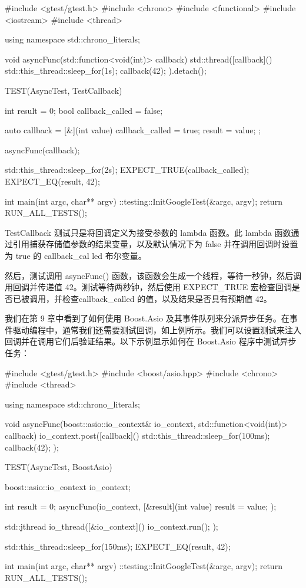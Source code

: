 \begin{cpp}
#include <gtest/gtest.h>
#include <chrono>
#include <functional>
#include <iostream>
#include <thread>

using namespace std::chrono_literals;

void asyncFunc(std::function<void(int)> callback) {
    std::thread([callback]() {
        std::this_thread::sleep_for(1s);
        callback(42);
    }).detach();
}

TEST(AsyncTest, TestCallback) {
    int result = 0;
    bool callback_called = false;

    auto callback = [&](int value) {
        callback_called = true;
        result = value;
    };

    asyncFunc(callback);

    std::this_thread::sleep_for(2s);
    EXPECT_TRUE(callback_called);
    EXPECT_EQ(result, 42);
}

int main(int argc, char** argv) {
    ::testing::InitGoogleTest(&argc, argv);
    return RUN_ALL_TESTS();
}
\end{cpp}

TestCallback 测试只是将回调定义为接受参数的 lambda 函数。此 lambda 函数通过引用捕获存储值参数的结果变量，以及默认情况下为 false 并在调用回调时设置为 true 的 callback\_cal led 布尔变量。

然后，测试调用 asyncFunc() 函数，该函数会生成一个线程，等待一秒钟，然后调用回调并传递值 42。测试等待两秒钟，然后使用 EXPECT\_TRUE 宏检查回调是否已被调用，并检查callback\_called 的值，以及结果是否具有预期值 42。


我们在第 9 章中看到了如何使用 Boost.Asio 及其事件队列来分派异步任务。在事件驱动编程中，通常我们还需要测试回调，如上例所示。我们可以设置测试来注入回调并在调用它们后验证结果。以下示例显示如何在 Boost.Asio 程序中测试异步任务：

\begin{cpp}
#include <gtest/gtest.h>
#include <boost/asio.hpp>
#include <chrono>
#include <thread>

using namespace std::chrono_literals;

void asyncFunc(boost::asio::io_context& io_context,
               std::function<void(int)> callback) {
    io_context.post([callback]() {
        std::this_thread::sleep_for(100ms);
        callback(42);
    });
}

TEST(AsyncTest, BoostAsio) {
    boost::asio::io_context io_context;

    int result = 0;
    asyncFunc(io_context, [&result](int value) {
        result = value;
    });

    std::jthread io_thread([&io_context]() {
        io_context.run();
    });

    std::this_thread::sleep_for(150ms);
    EXPECT_EQ(result, 42);
}

int main(int argc, char** argv) {
    ::testing::InitGoogleTest(&argc, argv);
    return RUN_ALL_TESTS();
}
\end{cpp}

